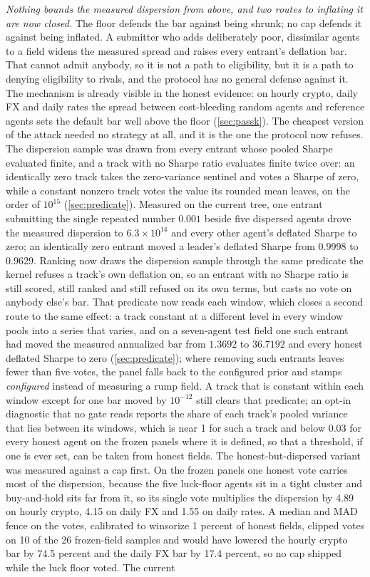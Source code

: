 \emph{Nothing bounds the measured dispersion from above, and two routes to inflating it are now closed.} The floor defends the bar against being shrunk; no cap defends it against being inflated. A submitter who adds deliberately poor, dissimilar agents to a field widens the measured spread and raises every entrant's deflation bar. That cannot admit anybody, so it is not a path to eligibility, but it is a path to denying eligibility to rivals, and the protocol has no general defense against it. The mechanism is already visible in the honest evidence: on hourly crypto, daily FX and daily rates the spread between cost-bleeding random agents and reference agents sets the default bar well above the floor (\cref{sec:passk}). The cheapest version of the attack needed no strategy at all, and it is the one the protocol now refuses. The dispersion sample was drawn from every entrant whose pooled Sharpe evaluated finite, and a track with no Sharpe ratio evaluates finite twice over: an identically zero track takes the zero-variance sentinel and votes a Sharpe of zero, while a constant nonzero track votes the value its rounded mean leaves, on the order of $10^{15}$ (\cref{sec:predicate}). Measured on the current tree, one entrant submitting the single repeated number $0.001$ beside five dispersed agents drove the measured dispersion to $6.3\times10^{14}$ and every other agent's deflated Sharpe to zero; an identically zero entrant moved a leader's deflated Sharpe from $0.9998$ to $0.9629$. Ranking now draws the dispersion sample through the same predicate the kernel refuses a track's own deflation on, so an entrant with no Sharpe ratio is still scored, still ranked and still refused on its own terms, but casts no vote on anybody else's bar. That predicate now reads each window, which closes a second route to the same effect: a track constant at a different level in every window pools into a series that varies, and on a seven-agent test field one such entrant had moved the measured annualized bar from $1.3692$ to $36.7192$ and every honest deflated Sharpe to zero (\cref{sec:predicate}); where removing such entrants leaves fewer than five votes, the panel falls back to the configured prior and stamps \emph{configured} instead of measuring a rump field. A track that is constant within each window except for one bar moved by $10^{-12}$ still clears that predicate; an opt-in diagnostic that no gate reads reports the share of each track's pooled variance that lies between its windows, which is near 1 for such a track and below 0.03 for every honest agent on the frozen panels where it is defined, so that a threshold, if one is ever set, can be taken from honest fields. The honest-but-dispersed variant was measured against a cap first. On the frozen panels one honest vote carries most of the dispersion, because the five luck-floor agents sit in a tight cluster and buy-and-hold sits far from it, so its single vote multiplies the dispersion by 4.89 on hourly crypto, 4.15 on daily FX and 1.55 on daily rates. A median and MAD fence on the votes, calibrated to winsorize 1 percent of honest fields, clipped votes on 10 of the 26 frozen-field samples and would have lowered the hourly crypto bar by 74.5 percent and the daily FX bar by 17.4 percent, so no cap shipped while the luck floor voted. The current 